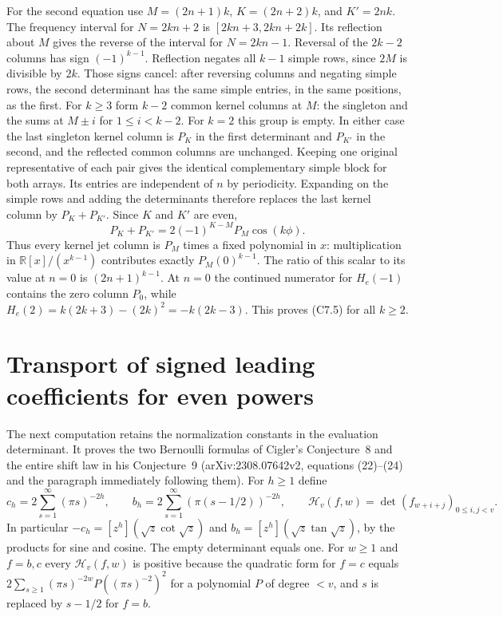 \documentclass[11pt,a4paper]{article}
\begin{document}
For the second equation use $M=(2n+1)k$, $K=(2n+2)k$, and $K'=2nk$. The frequency interval for $N=2kn+2$ is $[2kn+3,2kn+2k]$. Its reflection about $M$ gives the reverse of the interval for $N=2kn-1$. Reversal of the $2k-2$ columns has sign $(-1)^{k-1}$. Reflection negates all $k-1$ simple rows, since $2M$ is divisible by $2k$. Those signs cancel: after reversing columns and negating simple rows, the second determinant has the same simple entries, in the same positions, as the first. For $k\ge3$ form $k-2$ common kernel columns at $M$: the singleton and the sums at $M\pm i$ for $1\le i<k-2$. For $k=2$ this group is empty. In either case the last singleton kernel column is $P_K$ in the first determinant and $P_{K'}$ in the second, and the reflected common columns are unchanged. Keeping one original representative of each pair gives the identical complementary simple block for both arrays. Its entries are independent of $n$ by periodicity. Expanding on the simple rows and adding the determinants therefore replaces the last kernel column by $P_K+P_{K'}$. Since $K$ and $K'$ are even,
\[
 P_K+P_{K'}=2(-1)^{K-M} P_M\cos(k\phi).
\]
Thus every kernel jet column is $P_M$ times a fixed polynomial in $x$: multiplication in $\mathbb R[x]/(x^{k-1})$ contributes exactly $P_M(0)^{k-1}$. The ratio of this scalar to its value at $n=0$ is $(2n+1)^{k-1}$. At $n=0$ the continued numerator for $H_e(-1)$ contains the zero column $P_0$, while $H_e(2)=k(2k+3)-(2k)^2=-k(2k-3)$. This proves (C7.5) for all $k\ge2$.

\section{Transport of signed leading coefficients for even powers}
The next computation retains the normalization constants in the evaluation determinant. It proves the two Bernoulli formulas of Cigler's Conjecture~8 and the entire shift law in his Conjecture~9 (arXiv:2308.07642v2, equations (22)--(24) and the paragraph immediately following them). For $h\ge1$ define
\[
 c_h=2\sum_{s=1}^\infty(\pi s)^{-2h},\qquad
 b_h=2\sum_{s=1}^\infty(\pi(s-1/2))^{-2h},\qquad
 \mathcal H_v(f,w)=\det(f_{w+i+j})_{0\le i,j<v}.
\]
In particular $-c_h=[z^h](\sqrt z\cot\sqrt z)$ and $b_h=[z^h](\sqrt z\tan\sqrt z)$, by the products for sine and cosine. The empty determinant equals one. For $w\ge1$ and $f=b,c$ every $\mathcal H_v(f,w)$ is positive because the quadratic form for $f=c$ equals $2\sum_{s\ge1}(\pi s)^{-2w}P((\pi s)^{-2})^2$ for a polynomial $P$ of degree $<v$, and $s$ is replaced by $s-1/2$ for $f=b$.
\end{document}
